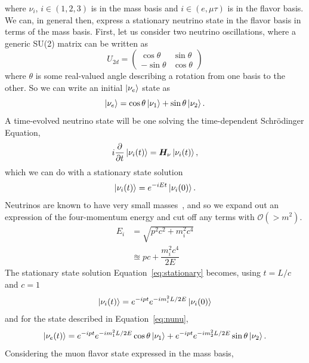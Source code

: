 \documentclass[main.tex]{subfiles}
\begin{document}
where $\nu_{i}$, $i\in\left(1,2,3\right)$ is in the mass basis and $i\in\left(e,\mu\tau\right)$ is in the flavor basis. 
We can, in general then, express a stationary neutrino state in the flavor basis in terms of the mass basis. 
First, let us consider two neutrino oscillations, where a generic SU(2) matrix can be written as 
\begin{equation}
    U_{2d}=\left(\begin{array}{cc} \cos\theta & \sin\theta \\ -\sin\theta & \cos\theta \end{array}\right)
\end{equation}
where $\theta$ is some real-valued angle describing a rotation from one basis to the other. So we can write an initial $\left| \nu_{e} \right >$ state as 
\begin{equation}\label{eq:nunu}
    \left| \nu_{e} \right > = \cos\theta \left| \nu_{1} \right > + \sin\theta \left| \nu_{2} \right >.
\end{equation}
A time-evolved neutrino state will be one solving the time-dependent Schr\"odinger Equation,
\begin{equation}
    i\dfrac{\partial}{\partial t} \left| \nu_{i} (t) \right > = \bm{H}_{\nu}\left| \nu_{i}(t) \right >,
\end{equation}
which we can do with a stationary state solution
\begin{equation}\label{eq:stationary}
    \left| \nu_{i} (t) \right >  =  e^{-iEt} \left| \nu_{i} (0) \right >.
\end{equation}
Neutrinos are known to have very small masses~\cite{KATRIN:2021uub}, and so we expand out an expression of the four-momentum energy and cut off any terms with $\mathcal{O}(>m^{2})$. 
\begin{align}
    E_{i} &= \sqrt{p^{2}c^{2} + m_{i}^{2}c^{4}} \\
    &\approxeq pc + \dfrac{m_{i}^{2}c^{4}}{2E}
\end{align}
The stationary state solution Equation~\eqref{eq:stationary} becomes, using $t=L/c$ and $c=1$ 
\begin{equation}
    \left| \nu_{i} (t) \right >  =  e^{-ipt}e^{ -im_{i}^{2}L/2E}\left| \nu_{i} (0) \right >
\end{equation}
and for the state described in Equation~\eqref{eq:nunu},
\begin{equation}
    \left| \nu_{e}(t) \right > = e^{-ipt}e^{ -im_{1}^{2}L/2E} \cos\theta \left| \nu_{1} \right >  + e^{-ipt}e^{ -im_{2}^{2}L/2E} \sin\theta \left| \nu_{2} \right >.
\end{equation}
Considering the muon flavor state expressed in the mass basis,
\end{document}
